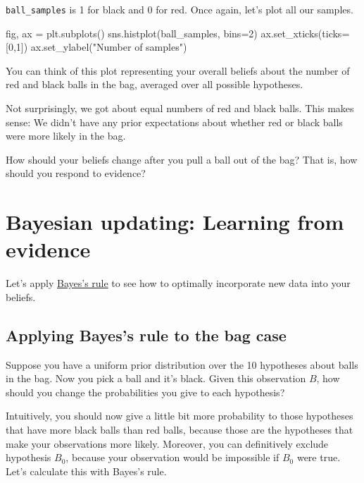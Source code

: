 \documentclass[
  letterpaper,
  DIV=11,
  numbers=noendperiod]{scrreprt}
\newenvironment{Shaded}{\begin{snugshade}}{\end{snugshade}}
\newcommand{\DecValTok}[1]{\textcolor[rgb]{0.68,0.00,0.00}{#1}}
\newcommand{\NormalTok}[1]{\textcolor[rgb]{0.00,0.23,0.31}{#1}}
\newcommand{\OperatorTok}[1]{\textcolor[rgb]{0.37,0.37,0.37}{#1}}
\newcommand{\StringTok}[1]{\textcolor[rgb]{0.13,0.47,0.30}{#1}}
\begin{document}
\texttt{ball\_samples} is 1 for black and 0 for red. Once again, let's
plot all our samples.

\begin{Shaded}
\begin{Highlighting}[]
\NormalTok{fig, ax }\OperatorTok{=}\NormalTok{ plt.subplots()}
\NormalTok{sns.histplot(ball\_samples, bins}\OperatorTok{=}\DecValTok{2}\NormalTok{)}
\NormalTok{ax.set\_xticks(ticks}\OperatorTok{=}\NormalTok{[}\DecValTok{0}\NormalTok{,}\DecValTok{1}\NormalTok{])}
\NormalTok{ax.set\_ylabel(}\StringTok{"Number of samples"}\NormalTok{)}
\end{Highlighting}
\end{Shaded}

You can think of this plot representing your overall beliefs about the
number of red and black balls in the bag, averaged over all possible
hypotheses.

Not surprisingly, we got about equal numbers of red and black balls.
This makes sense: We didn't have any prior expectations about whether
red or black balls were more likely in the bag.

How should your beliefs change after you pull a ball out of the bag?
That is, how should you respond to evidence?

\section{Bayesian updating: Learning from evidence
🤔}\label{bayesian-updating-learning-from-evidence}

Let's apply \hyperref[basic-probability]{Bayes's rule} to see how to
optimally incorporate new data into your beliefs.

\subsection{Applying Bayes's rule to the bag
case}\label{applying-bayess-rule-to-the-bag-case}

Suppose you have a uniform prior distribution over the 10 hypotheses
about balls in the bag. Now you pick a ball and it's black. Given this
observation \(B\), how should you change the probabilities you give to
each hypothesis?

Intuitively, you should now give a little bit more probability to those
hypotheses that have more black balls than red balls, because those are
the hypotheses that make your observations more likely. Moreover, you
can definitively exclude hypothesis \(B_0\), because your observation
would be impossible if \(B_0\) were true. Let's calculate this with
Bayes's rule.
\end{document}
